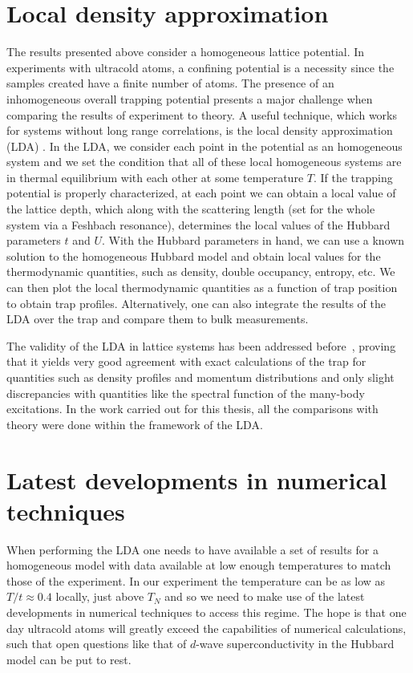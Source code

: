 \section{ Local density approximation }

The results presented above consider a homogeneous lattice potential.  In
experiments with ultracold atoms,  a confining potential is a necessity since
the samples created have a finite number of atoms.  The presence of an
inhomogeneous overall trapping potential presents a major challenge when
comparing the results of experiment to theory.  A useful technique, which works
for systems without long range correlations, is the local density approximation
(LDA) .  In the LDA, we consider each point in the potential as an homogeneous
system and we set the condition that all of these local homogeneous systems are
in thermal equilibrium with each other  at some temperature $T$.  If the
trapping potential is properly characterized,  at each point we can obtain a
local value of the lattice depth, which along with the scattering length (set
for the whole system via a Feshbach resonance), determines the local values of
the Hubbard parameters $t$ and $U$.  With the Hubbard parameters in hand, we
can use a known solution to the homogeneous Hubbard model and obtain local
values for the thermodynamic quantities, such as density, double occupancy,
entropy, etc.   We can then plot the local thermodynamic quantities as a
function of trap position to obtain trap profiles.  Alternatively, one can also
integrate the results of the LDA over the trap and compare them to bulk
measurements. 


The validity of the LDA in lattice systems has been addressed
before~\cite{Rigol2003,Helmes2008,Chiesa2011},  proving that it yields very
good agreement with exact calculations of the trap for quantities such as
density profiles and momentum distributions and only slight discrepancies with
quantities like the spectral function of the many-body excitations.  In the
work carried out for this thesis, all the comparisons with theory were done
within the framework of the LDA. 


\section{Latest developments in numerical techniques}

When performing the LDA one needs to have available a set of results for a
homogeneous model with data available at low enough temperatures to match those
of the experiment.   In our experiment the temperature can be as low as
$T/t\approx0.4$ locally, just above $T_{N}$ and so we need to make use of the
latest developments in numerical techniques to access this regime.   The hope
is that one day ultracold atoms will greatly exceed the capabilities of
numerical calculations, such that open questions like that of $d$-wave
superconductivity in the Hubbard model can be put to rest. 

